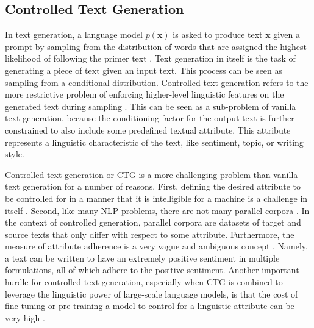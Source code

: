 \subsection{Controlled Text Generation}


In text generation, a language model $p(\textbf{x})$ is asked to produce text $\textbf{x}$ given a prompt by sampling from the distribution of words that are assigned the highest likelihood of following the primer text \citep{radford2019language}. Text generation in itself is the task of generating a piece of text given an input text. This process can be seen as sampling from a conditional distribution. Controlled text generation refers to the more restrictive problem of enforcing higher-level linguistic features on the generated text during sampling \citep{dathathri2019plug, prabhumoye-etal-2020-exploring}. This can be seen as a sub-problem of vanilla text generation, because the conditioning factor for the output text is further constrained to also include some predefined textual attribute. This attribute represents a linguistic characteristic of the text, like sentiment, topic, or writing style. 


Controlled text generation or CTG is a more challenging problem than vanilla text generation for a number of reasons. First, defining the desired attribute to be controlled for in a manner that it is intelligible for a machine is a challenge in itself \citep{zheng2019personalized}. Second, like many NLP problems, there are not many parallel corpora \citep{dai2019style}. In the context of controlled generation, parallel corpora are datasets of target and source texts that only differ with respect to some attribute. Furthermore, the measure of attribute adherence is a very vague and ambiguous concept \citep{dathathri2019plug, dai2019style}. Namely, a text can be written to have an extremely positive sentiment in multiple formulations, all of which adhere to the positive sentiment. Another important hurdle for controlled text generation, especially when CTG is combined to leverage the linguistic power of large-scale language models, is that the cost of fine-tuning or pre-training a model to control for a linguistic attribute can be very high \citep{dathathri2019plug, madotto-etal-2020-plug}. 

